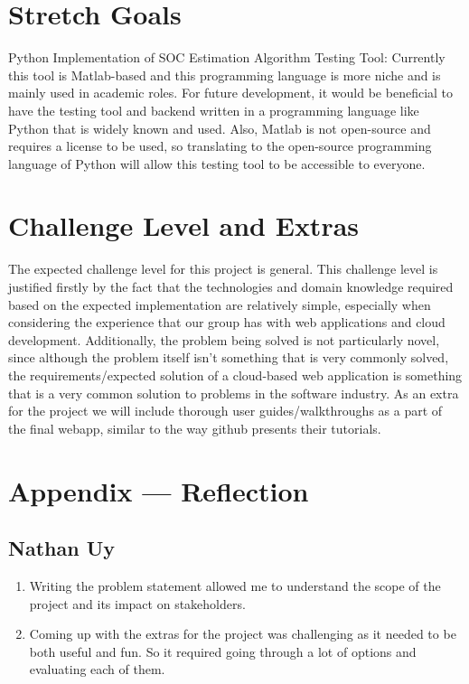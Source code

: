 \documentclass{article}
\begin{document}
\section{Stretch Goals}

Python Implementation of SOC Estimation Algorithm Testing Tool: Currently this tool is Matlab-based and this programming language is more niche and is mainly used in academic roles. For future development, it would be beneficial to have the testing tool and backend written in a programming language like Python that is widely known and used. Also, Matlab is not open-source and requires a license to be used, so translating to the open-source programming language of Python will allow this testing tool to be accessible to everyone.  

\section{Challenge Level and Extras}

The expected challenge level for this project is general. This challenge level is justified firstly by the fact that the technologies and domain knowledge required based on the expected implementation are relatively simple, especially when considering the experience that our group has with web applications and cloud development. Additionally, the problem being solved is not particularly novel, since although the problem itself isn’t something that is very commonly solved, the requirements/expected solution of a cloud-based web application is something that is a very common solution to problems in the software industry. \newline \newline
As an extra for the project we will include thorough user guides/walkthroughs as a part of the final webapp, similar to the way github presents their tutorials.


\newpage{}

\section*{Appendix --- Reflection}

\subsection*{Nathan Uy}

\begin{enumerate}
    \item Writing the problem statement allowed me to understand the scope of the project and its impact on stakeholders.
    \item Coming up with the extras for the project was challenging as it needed to be both useful and fun. So it required going through a lot of options and evaluating each of them.
\end{enumerate}  
\end{document}

